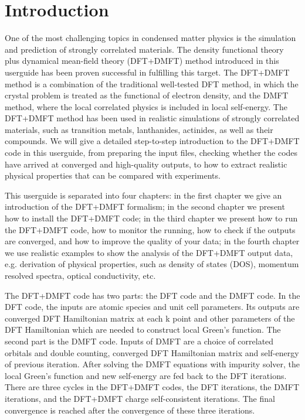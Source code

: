 \documentclass[12 pt]{article}
\begin{document}
  \newpage

  \part{Introduction}

    One of the most challenging topics in condensed matter physics is the simulation and prediction of strongly 
correlated materials. The density functional theory plus dynamical mean-field theory (DFT+DMFT) method introduced in
 this userguide has been proven successful in fulfilling this target. The DFT+DMFT method is a combination of the 
traditional well-tested DFT method, in which the crystal problem is treated as the functional of electron density, 
and the DMFT method, where the local correlated physics is included in local self-energy. The DFT+DMFT method has 
been used in realistic simulations of strongly correlated materials, such as transition metals, lanthanides, 
actinides, as well as their compounds. We will give a detailed step-to-step introduction to the DFT+DMFT code in 
this userguide, from preparing the input files, checking whether the codes have arrived at converged and high-quality
 outputs, to how to extract realistic physical properties that can be compared with experiments.

This userguide is separated into four chapters: in the first chapter we give an introduction of the DFT+DMFT 
formalism; in the second chapter we present how to install the DFT+DMFT code; in the third chapter we present how to
 run the DFT+DMFT code, how to monitor the running, how to check if the outputs are converged, and how to improve the
 quality of your data; in the fourth chapter we use realistic examples to show the analysis of the DFT+DMFT output 
data, e.g. derivation of physical properties, such as density of states (DOS), momentum resolved spectra, optical 
conductivity, etc.

  The DFT+DMFT code has two parts: the DFT code and the DMFT code. In the DFT code, the inputs are atomic species and 
unit cell parameters. Its outputs are converged DFT Hamiltonian matrix at each k point and other parameters of the 
DFT Hamiltonian which are needed to construct local Green's function. The second part is the DMFT code. Inputs of 
DMFT are a choice of correlated orbitals and double counting, converged DFT Hamiltonian matrix and self-energy of 
previous iteration. After solving the DMFT equations with impurity solver, the local Green's function and new 
self-energy are fed back to the DFT iterations. There are three cycles in the DFT+DMFT codes, the DFT iterations, the
 DMFT iterations, and the DFT+DMFT charge self-consistent iterations. The final convergence is reached after the 
convergence of these three iterations.
\end{document}
